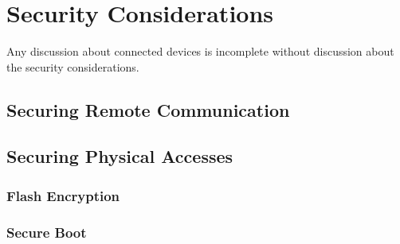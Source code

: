 \documentclass[main.tex]{subfiles}
\begin{document}
\chapter{Security Considerations}

Any discussion about connected devices is incomplete without discussion about the security considerations.

\section{Securing Remote Communication}



\section{Securing Physical Accesses}
\subsection{Flash Encryption}

\subsection{Secure Boot}
\end{document}
